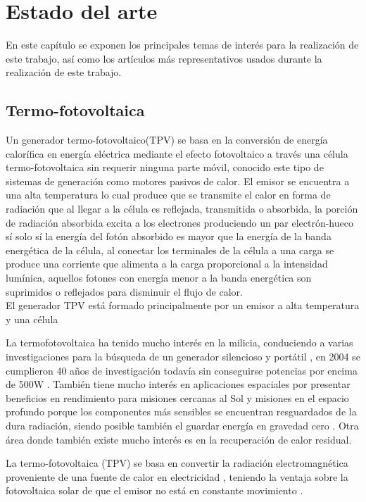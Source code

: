 \chapter{Estado del arte}


En este capítulo se exponen los principales temas de interés para la realización de este trabajo, así como los artículos más representativos usados durante la realización de este trabajo.
\section{Termo-fotovoltaica}
Un generador termo-fotovoltaico(TPV) se basa en la conversión de energía calorífica en energía eléctrica mediante el efecto fotovoltaico a través una célula termo-fotovoltaica sin requerir ninguna parte móvil, conocido este tipo de sistemas de generación como motores pasivos de calor. El emisor se encuentra a una alta temperatura lo cual produce que se transmite el calor en forma de radiación que al llegar a la célula es reflejada, transmitida o absorbida, la porción de radiación absorbida excita a los electrones produciendo un par electrón-hueco sí solo sí la energía del fotón absorbido es mayor que la energía de la banda energética de la célula, al conectar los terminales de la célula a una carga se produce una corriente que alimenta a la carga proporcional a la intensidad lumínica, aquellos fotones con energía menor a la banda energética son suprimidos o reflejados para disminuir el flujo de calor\cite{Present_Efficiencies_and_Future_Opportunities_in_Thermophotovoltaics}.\\

El generador TPV está formado principalmente por un emisor a alta temperatura y una célula 

La termofotovoltaica ha tenido mucho interés en la milicia, conduciendo a varias investigaciones para la búsqueda de un generador silencioso y portátil \cite{military_TPV}, en 2004 se cumplieron 40 años de investigación todavía sin conseguirse potencias por encima de 500W \cite{military_TPV_40Years}. También tiene mucho interés en aplicaciones espaciales por presentar beneficios en rendimiento para misiones cercanas al Sol y misiones en el espacio profundo porque los componentes más sensibles se encuentran resguardados de la dura radiación, siendo posible también el guardar energía en gravedad cero \cite{TPV_space_applications} . Otra área donde también existe mucho interés es en la recuperación de calor residual\cite{wasteHeat_TPV}.

La termo-fotovoltaica (TPV) se basa en convertir la radiación electromagnética proveniente de una fuente de calor en electricidad \cite{ThermophotovolticEnergyConversion_DATAS2021285}, teniendo la ventaja sobre la fotovoltaica solar de que el emisor no está en constante movimiento \cite{ThermophotovolticEnergyConversion_DATAS2021285}.\\

